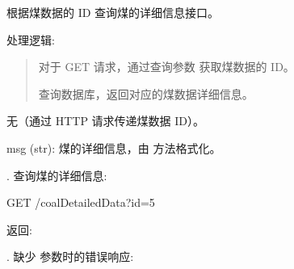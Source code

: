 \documentclass[a4paper,12pt,english]{sphinxmanual}
\begin{document}
\begin{fulllineitems}
\label{\detokenize{api/login:login.getDetailedData}}
\pysigstartsignatures
{}
\pysigstopsignatures
\sphinxAtStartPar
根据煤数据的 ID 查询煤的详细信息接口。

\sphinxAtStartPar
处理逻辑:
\begin{quote}

\sphinxAtStartPar
对于 GET 请求，通过查询参数  获取煤数据的 ID。

\sphinxAtStartPar
查询数据库，返回对应的煤数据详细信息。
\end{quote}
\begin{description}
\sphinxAtStartPar
无（通过 HTTP 请求传递煤数据 ID）。

\begin{description}
\sphinxAtStartPar
msg (str): 煤的详细信息，由  方法格式化。

\end{description}

. 查询煤的详细信息:

\begin{sphinxVerbatim}[commandchars=\\\{\}]
GET /coalDetailedData?id=5
\end{sphinxVerbatim}

\sphinxAtStartPar
返回:

\begin{sphinxVerbatim}[commandchars=\\\{\}]
     
         
         
\end{sphinxVerbatim}

. 缺少  参数时的错误响应:

\begin{sphinxVerbatim}[commandchars=\\\{\}]
 
\end{sphinxVerbatim}


\end{description}
\end{fulllineitems}
\end{document}
